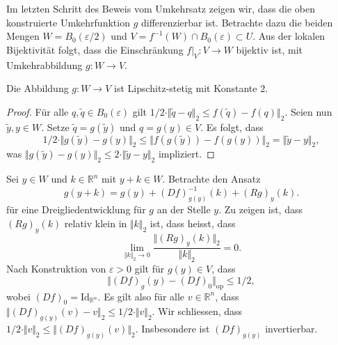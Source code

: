 \documentclass[../main.tex]{subfiles}
\begin{document}
Im letzten Schritt des Beweis vom Umkehrsatz zeigen wir,
dass die oben konstruierte Umkehrfunktion $g$ differenzierbar ist.
Betrachte dazu die beiden Mengen $W = B_0(\varepsilon / 2)$ und 
$V = f^{-1}(W) \cap B_0(\varepsilon) \subset U$.
Aus der lokalen Bijektivität folgt, dass die Einschränkung
$f|_{V} \colon V \to W$ bijektiv ist, mit Umkehrabbildung
$g \colon W \to V$.

\begin{claim}
  Die Abbildung $g \colon W \to V$ ist Lipschitz-stetig
  mit Konstante $2$.
\end{claim}

\begin{proof}
  Für alle $q, \widetilde q \in B_0(\varepsilon)$ gilt
  \(
    1/2 \cdot 
    \Vert \widetilde q - q \Vert_2 \leq f(\widetilde q) - f(q) \Vert_2.
  \)
  Seien nun $\widetilde y, y \in W$. Setze
  $\widetilde q = g(\widetilde y)$ 
  und $q = g(y) \in V$.
  Es folgt, dass
  \[
    1/2 \cdot \Vert g(\widetilde y) - g(y) \Vert_2 \leq
    \Vert f(g(\widetilde y )) - f(g(y)) \Vert_2 = \Vert \widetilde y
    - y \Vert_2,
  \]
  was $\Vert g( \widetilde y ) - g(y) \Vert_2 \leq 2 \cdot \Vert \widetilde
  y - y \Vert_2$
  impliziert.
\end{proof}

Sei $y \in W$ und $k \in \mathbb{R}^n$ mit $y + k \in W$.
Betrachte den Ansatz
\[
  g(y + k ) = g(y) + {(Df)}_{g(y)}^{-1}(k) + {(Rg)}_{y}(k).
\]
für eine Dreigliedentwicklung für $g$ an der Stelle $y$.
Zu zeigen ist, dass ${(Rg)}_{y}(k)$ relativ klein in $\Vert k \Vert_2$ ist,
dass heisst, dass
\[
  \lim_{\Vert k \Vert_2 \to 0}
  \frac{\Vert {(Rg)}_y(k) \Vert_2}{\Vert k \Vert_2} = 0.
\]
Nach Konstruktion von $\varepsilon > 0$ gilt für
$g(y) \in V$, dass
\[
  \Vert {(Df)}_g(y) - {(Df)}_0 \Vert_{\text{op}} \leq 1/2,
\]
wobei ${(Df)}_0 = \text{Id}_{\mathbb{R}^n}$.
Es gilt also für alle $v \in \mathbb{R}^n$, dass
\(
  \Vert {(Df)}_{g(y)}(v) - v \Vert_2 \leq 1/2 \cdot \Vert v \Vert_2.
\)
Wir schliessen, dass $1/2 \cdot \Vert v \Vert_2 \leq \Vert
{(Df)}_{g(y)}(v) \Vert_2$.
Insbesondere ist ${(Df)}_{g(y)}$ invertierbar.
\end{document}
